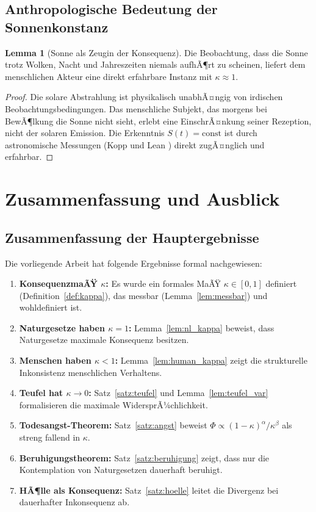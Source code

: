 ﻿\documentclass[a4paper,12pt]{article}
\theoremstyle{definition}
\newtheorem{lemma}{Lemma}
\begin{document}
\subsection{Anthropologische Bedeutung der Sonnenkonstanz}

\begin{lemma}[Sonne als Zeugin der Konsequenz]
\label{lem:sonne_zeuge}
Die Beobachtung, dass die Sonne trotz Wolken, Nacht und Jahreszeiten niemals aufhÃ¶rt zu scheinen, liefert dem menschlichen Akteur eine direkt erfahrbare Instanz mit $\kappa \approx 1$.
\end{lemma}

\begin{proof}
Die solare Abstrahlung ist physikalisch unabhÃ¤ngig von irdischen Beobachtungsbedingungen. Das menschliche Subjekt, das morgens bei BewÃ¶lkung die Sonne nicht sieht, erlebt eine EinschrÃ¤nkung seiner Rezeption, nicht der solaren Emission. Die Erkenntnis $S(t) = \text{const}$ ist durch astronomische Messungen (Kopp und Lean \cite{kopp2011}) direkt zugÃ¤nglich und erfahrbar. \qedhere
\end{proof}

\section{Zusammenfassung und Ausblick}

\subsection{Zusammenfassung der Hauptergebnisse}

Die vorliegende Arbeit hat folgende Ergebnisse formal nachgewiesen:

\begin{enumerate}
\item \textbf{KonsequenzmaÃŸ $\kappa$:} Es wurde ein formales MaÃŸ $\kappa \in [0,1]$ definiert (Definition~\ref{def:kappa}), das messbar (Lemma~\ref{lem:messbar}) und wohldefiniert ist.
\item \textbf{Naturgesetze haben $\kappa = 1$:} Lemma~\ref{lem:nl_kappa} beweist, dass Naturgesetze maximale Konsequenz besitzen.
\item \textbf{Menschen haben $\kappa < 1$:} Lemma~\ref{lem:human_kappa} zeigt die strukturelle Inkonsistenz menschlichen Verhaltens.
\item \textbf{Teufel hat $\kappa \to 0$:} Satz~\ref{satz:teufel} und Lemma~\ref{lem:teufel_var} formalisieren die maximale WidersprÃ¼chlichkeit.
\item \textbf{Todesangst-Theorem:} Satz~\ref{satz:angst} beweist $\Phi \propto (1-\kappa)^\alpha / \kappa^\beta$ als streng fallend in $\kappa$.
\item \textbf{Beruhigungstheorem:} Satz~\ref{satz:beruhigung} zeigt, dass nur die Kontemplation von Naturgesetzen dauerhaft beruhigt.
\item \textbf{HÃ¶lle als Konsequenz:} Satz~\ref{satz:hoelle} leitet die Divergenz bei dauerhafter Inkonsequenz ab.
\end{enumerate}
\end{document}
